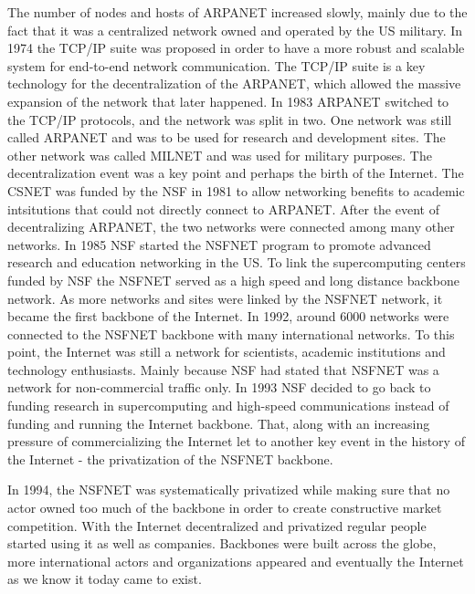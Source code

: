 \documentclass[a4paper,11pt]{kth-mag}
\begin{document}
        The number of nodes and hosts of \gls{ARPANET} increased slowly, mainly due to the fact that it was a centralized network owned and operated by the \gls{US} military.
        In 1974 the \gls{TCP}/\gls{IP} suite was proposed in order to have a more robust and scalable system for end-to-end network communication.
        The \gls{TCP}/\gls{IP} suite is a key technology for the decentralization of the \gls{ARPANET}, which allowed the massive expansion of the network that later happened.
        In 1983 \gls{ARPANET} switched to the \gls{TCP}/\gls{IP} protocols, and the network was split in two.
        One network was still called \gls{ARPANET} and was to be used for research and development sites.
        The other network was called \gls{MILNET} and was used for military purposes.
        The decentralization event was a key point and perhaps the birth of the Internet.
        The \gls{CSNET} was funded by the \gls{NSF} in 1981 to allow networking benefits to academic intsitutions that could not directly connect to \gls{ARPANET}.
        After the event of decentralizing \gls{ARPANET}, the two networks were connected among many other networks.
        In 1985 \gls{NSF} started the \gls{NSFNET} program to promote advanced research and education networking in the \gls{US}.
        To link the supercomputing centers funded by \gls{NSF} the \gls{NSFNET} served as a high speed and long distance backbone network.
        As more networks and sites were linked by the \gls{NSFNET} network, it became the first backbone of the Internet.
        In 1992, around 6000 networks were connected to the \gls{NSFNET} backbone with many international networks.
        To this point, the Internet was still a network for scientists, academic institutions and technology enthusiasts.
        Mainly because \gls{NSF} had stated that \gls{NSFNET} was a network for non-commercial traffic only.
        In 1993 \gls{NSF} decided to go back to funding research in supercomputing and high-speed communications instead of funding and running the Internet backbone.
        That, along with an increasing pressure of commercializing the Internet let to another key event in the history of the Internet - the privatization of the \gls{NSFNET} backbone.

        In 1994, the \gls{NSFNET} was systematically privatized while making sure that no actor owned too much of the backbone in order to create constructive market competition.
        With the Internet decentralized and privatized regular people started using it as well as companies.
        Backbones were built across the globe, more international actors and organizations appeared and eventually the Internet as we know it today came to exist.
\end{document}
